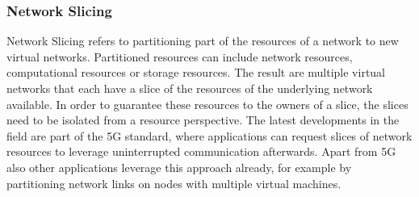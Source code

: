 \documentclass{article}
\begin{document}
\subsubsection{Network Slicing}
Network Slicing \cite{slicing} refers to partitioning part of the resources of a network to new virtual networks. Partitioned resources can include network resources, computational resources or storage resources. The result are multiple virtual networks that each have a slice of the resources of the underlying network available. In order to guarantee these resources to the owners of a slice, the slices need to be isolated from a resource perspective. The latest developments in the field are part of the 5G standard, where applications can request slices of network resources to leverage uninterrupted communication afterwards. Apart from 5G also other applications leverage this approach already, for example by partitioning network links on nodes with multiple virtual machines.
\end{document}
